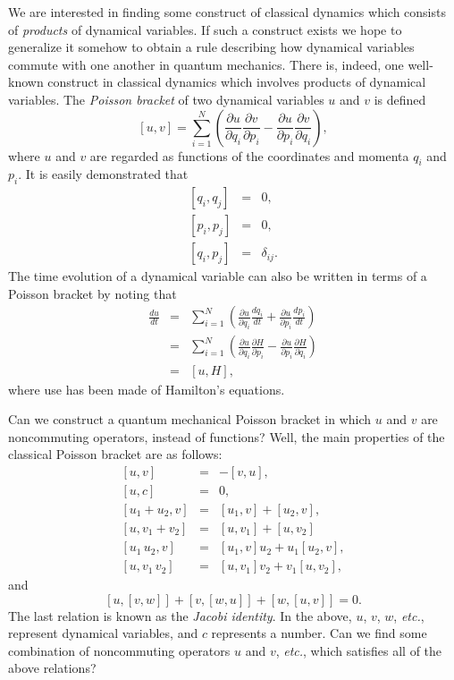 We are interested in 
finding some
construct of classical dynamics which consists of
{\em products} of dynamical variables. If such a construct exists we hope to 
generalize it somehow to obtain  a
rule describing how dynamical variables
commute with one another in quantum mechanics. There is, indeed,
 one well-known construct
in classical dynamics which involves products of dynamical variables. The
{\em Poisson bracket} of two dynamical variables $u$ and $v$ is defined
\begin{equation}\label{e3.2}
[u, v] = \sum_{i=1}^N \left(\frac{\partial u}{\partial q_i}\frac{\partial v}
{\partial p_i} - \frac{\partial u}{\partial p_i}\frac{\partial v}{\partial q_i}
\right),
\end{equation}
where $u$ and $v$ are regarded as functions of the coordinates 
and momenta $q_i$ and $p_i$. It is easily demonstrated that
\begin{eqnarray}\label{e3.3a}
[q_i, q_j] &=& 0,\\[0.5ex]
[p_i, p_j] &=& 0,\\[0.5ex]
[q_i, p_j] &=& \delta_{ij}.\label{e3.3c}
\end{eqnarray}
 The time evolution of a dynamical variable can also
be
written in terms of a Poisson bracket by noting that
\begin{eqnarray}
\frac{du}{dt}& = &\sum_{i=1}^N \left(\frac{\partial u}{\partial q_i}\frac{d q_i}{dt}
+ \frac{\partial u}{\partial p_i}\frac{dp_i}{dt}\right)\nonumber\\[0.5ex]
&=& \sum_{i=1}^N \left(\frac{\partial u}{\partial q_i}\frac{\partial H}{\partial p_i}
-\frac{\partial u}{\partial p_i}\frac{\partial H}{\partial q_i}\right)\nonumber
\\[0.5ex]
&=& [u, H],\label{e3.4}
\end{eqnarray}
where use has been made of Hamilton's equations. 

Can we construct a quantum mechanical Poisson bracket in which $u$ and
$v$ are noncommuting operators, instead of functions? Well, the main properties
of the classical Poisson bracket are as follows:
\begin{eqnarray}\label{e3.5a}
[u, v] &=& - [v, u],\\[0.5ex]
[u, c] &=& 0,\\[0.5ex]
[u_1+ u_2, v] &=& [u_1, v] + [u_2, v],\\[0.5ex]
[u, v_1 + v_2]&=& [u, v_1] + [u, v_2]\\[0.5ex]
[u_1\, u_2, v] &=& [u_1, v] u_2 + u_1 [u_2, v],\label{e3.5e}\\[0.5ex]
[u, v_1 \,v_2] &=& [u, v_1] v_2 + v_1 [u, v_2],\label{e3.5f}
\end{eqnarray}
and
\begin{equation}\label{e3.6}
[u, [v, w] ]+ [v, [w, u] ] + [w, [u, v]] = 0.
\end{equation}
The last relation is known as the {\em Jacobi identity}. In the above,
$u$, $v$, $w$, {\em etc.}, represent dynamical variables, and $c$ represents a number.
Can we find some combination of noncommuting operators $u$ and $v$, {\em etc.}, 
which satisfies all of the above relations?

